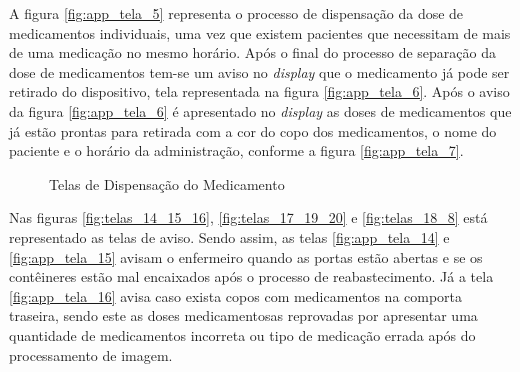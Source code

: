 \begin{apendicesenv}
A figura \ref{fig:app_tela_5} representa o processo de dispensação da dose de medicamentos individuais, uma vez que existem pacientes que necessitam de mais de uma medicação no mesmo horário. Após o final do processo de separação da dose de medicamentos tem-se um aviso no \textit{display} que o medicamento já pode ser retirado do dispositivo, tela representada na figura \ref{fig:app_tela_6}. Após o aviso da figura \ref{fig:app_tela_6} é apresentado no \textit{display} as doses de medicamentos que já estão prontas para retirada com a cor do copo dos medicamentos, o nome do paciente e o horário da administração, conforme a figura \ref{fig:app_tela_7}.

\begin{figure}[H]
    \centering
    \caption{Telas de Dispensação do Medicamento}\label{fig:telas_5_6_7}
\end{figure}

Nas figuras \ref{fig:telas_14_15_16}, \ref{fig:telas_17_19_20} e \ref{fig:telas_18_8} está representado as telas de aviso. Sendo assim, as telas \ref{fig:app_tela_14} e \ref{fig:app_tela_15} avisam o enfermeiro quando as portas estão abertas e se os contêineres estão mal encaixados após o processo de reabastecimento. Já a tela \ref{fig:app_tela_16} avisa caso exista copos com medicamentos na comporta traseira, sendo este as doses medicamentosas reprovadas por apresentar uma quantidade de medicamentos incorreta ou tipo de medicação errada após do processamento de imagem. 



\end{apendicesenv}
